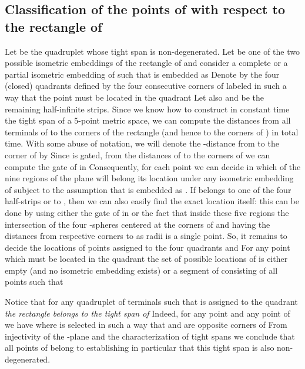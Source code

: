 \documentclass[11pt]{amsart}
\begin{document}
\subsection{Classification of the points of  with respect to the rectangle of }\label{Pcircb} Let 
be the quadruplet whose tight span  is non-degenerated.  Let
 be one of the two possible isometric embeddings of the rectangle  of  and consider a complete or a partial isometric embedding of  such that  is embedded as 
Denote by
 the four (closed) quadrants defined by the four consecutive corners  of  labeled in such a way that
the point  must be located in the quadrant  Let also  and  be the remaining half-infinite strips.
Since we know how to construct in constant time the tight span of  a 5-point
metric space, we can compute the distances from all terminals  of  to the corners of the rectangle  (and hence to the corners of ) in total  time. With some abuse of notation,
we will denote the -distance from  to the corner  of  by 
Since  is gated,
from the distances of  to the corners  of  we can compute the gate of   in  Consequently, for each point  we can decide in which of
the nine regions of the plane will belong its location  under any isometric embedding  of  subject to the assumption that  is embedded as .
If  belongs to one of the four half-strips or to , then we can also easily find
the exact location itself: this can be done by using either the gate of  in  or the fact that inside these five regions the intersection of the four -spheres centered at the corners of  and having the distances from respective corners to  as radii is a single point. So, it remains to decide the locations
of points assigned to the four quadrants  and   For any point 
which must be located in the quadrant  the set of possible locations of  is either empty (and no isometric embedding exists) or a segment  of  consisting of all points  such that 

Notice that for any quadruplet  of terminals such that  is assigned to the quadrant   {\it the rectangle  belongs to the tight span  of } Indeed, for any point  and any point  of  we have  where  is selected in such a way that  and  are opposite corners of  From injectivity of the -plane and the characterization of tight spans we conclude that all points of  belong
to  establishing in particular that this tight span is also non-degenerated.
\end{document}
